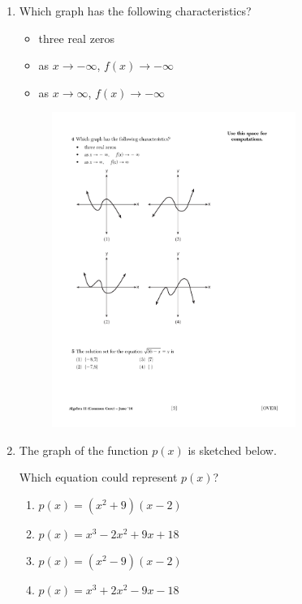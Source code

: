 \documentclass[12pt, oneside]{article}
\begin{document}
\begin{enumerate}
\item Which graph has the following characteristics?
\begin{itemize}
\item three real zeros
\item as $x \rightarrow - \infty$, $f(x) \rightarrow - \infty$
\item as $x \rightarrow \infty$, $f(x) \rightarrow - \infty$
\end{itemize}
\begin{figure}[!ht]
    \centering
    \includegraphics[width=0.75\textwidth]{cubic-graphs.pdf}
\end{figure} %

\newpage
\item The graph of the function $p(x)$ is sketched below.
\begin{center}
\end{center}
Which equation could represent $p(x)$?
\begin{enumerate}
    \item $p(x)=(x^2+ 9)(x-2)$
    \item $p(x)=x^3 -2x^2+ 9x+18$
    \item $p(x)=(x^2- 9)(x-2)$
    \item $p(x)=x^3 +2x^2- 9x-18$
\end{enumerate} %


\end{enumerate}
\end{document}
